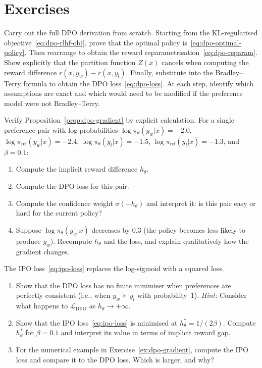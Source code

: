 \section*{Exercises}

\begin{exercise}
\label{ex:dpo-derivation}
Carry out the full DPO derivation from scratch. Starting from the KL-regularised objective~\eqref{eq:dpo-rlhf-obj}, prove that the optimal policy is~\eqref{eq:dpo-optimal-policy}. Then rearrange to obtain the reward reparametrisation~\eqref{eq:dpo-reparam}. Show explicitly that the partition function $Z(x)$ cancels when computing the reward difference $r(x, y_w) - r(x, y_l)$. Finally, substitute into the Bradley--Terry formula to obtain the DPO loss~\eqref{eq:dpo-loss}. At each step, identify which assumptions are exact and which would need to be modified if the preference model were not Bradley--Terry.
\end{exercise}

\begin{exercise}
\label{ex:dpo-gradient}
Verify Proposition~\ref{prop:dpo-gradient} by explicit calculation. For a single preference pair with log-probabilities $\log\pi_\theta(y_w|x) = -2.0$, $\log\pi_\mathrm{ref}(y_w|x) = -2.4$, $\log\pi_\theta(y_l|x) = -1.5$, $\log\pi_\mathrm{ref}(y_l|x) = -1.3$, and $\beta = 0.1$:
\begin{enumerate}
  \item Compute the implicit reward difference $h_\theta$.
  \item Compute the DPO loss for this pair.
  \item Compute the confidence weight $\sigma(-h_\theta)$ and interpret it: is this pair easy or hard for the current policy?
  \item Suppose $\log\pi_\theta(y_w|x)$ decreases by $0.3$ (the policy becomes less likely to produce $y_w$). Recompute $h_\theta$ and the loss, and explain qualitatively how the gradient changes.
\end{enumerate}
\end{exercise}

\begin{exercise}
\label{ex:ipo-vs-dpo}
The IPO loss~\eqref{eq:ipo-loss} replaces the log-sigmoid with a squared loss. 
\begin{enumerate}
  \item Show that the DPO loss has no finite minimiser when preferences are perfectly consistent (i.e., when $y_w \succ y_l$ with probability~$1$). \emph{Hint:} Consider what happens to $\mathcal{L}_\mathrm{DPO}$ as $h_\theta \to +\infty$.
  \item Show that the IPO loss~\eqref{eq:ipo-loss} is minimised at $h_\theta^* = 1/(2\beta)$. Compute $h_\theta^*$ for $\beta = 0.1$ and interpret its value in terms of implicit reward gap.
  \item For the numerical example in Exercise~\ref{ex:dpo-gradient}, compute the IPO loss and compare it to the DPO loss. Which is larger, and why?
\end{enumerate}
\end{exercise}

